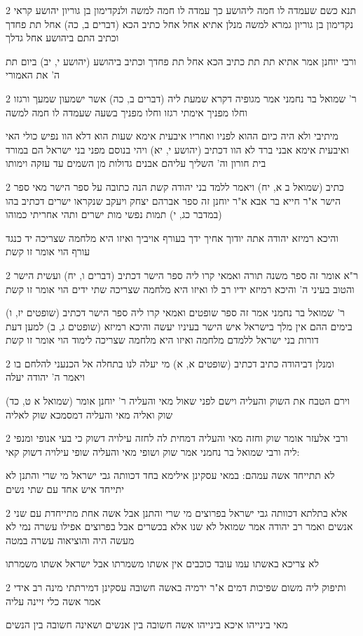 \documentclass[12pt, openany]{book}
\newcommand{\sethebfont}{
\fontsize{10.5pt}{21.0pt} \selectfont
}
\newcommand{\twocol}[1]{
	{\sethebfont \begin{multicols}{2}
			#1
	\end{multicols}}	
}
\begin{document}
\twocol{תנא כשם שעמדה לו חמה ליהושע כך עמדה לו חמה למשה ולנקדימון בן גוריון יהושע קראי נקדימון בן גוריון גמרא למשה מנלן אתיא אחל אחל כתיב הכא (דברים ב, כה) אחל תת פחדך וכתיב התם ביהושע אחל גדלך
\par ורבי יוחנן אמר אתיא תת תת כתיב הכא אחל תת פחדך וכתיב ביהושע (יהושע י, יב) ביום תת ה' את האמורי}
\twocol{ר' שמואל בר נחמני אמר מגופיה דקרא שמעת ליה (דברים ב, כה) אשר ישמעון שמעך ורגזו וחלו מפניך אימתי רגזו וחלו מפניך בשעה שעמדה לו חמה למשה
\par מיתיבי ולא היה כיום ההוא לפניו ואחריו איבעית אימא שעות הוא דלא הוו נפיש כולי האי ואיבעית אימא אבני ברד לא הוו דכתיב (יהושע י, יא) ויהי בנוסם מפני בני ישראל הם במורד בית חורון וה' השליך עליהם אבנים גדולות מן השמים עד עזקה וימותו}
\twocol{כתיב (שמואל ב א, יח) ויאמר ללמד בני יהודה קשת הנה כתובה על ספר הישר מאי ספר הישר א"ר חייא בר אבא א"ר יוחנן זה ספר אברהם יצחק ויעקב שנקראו ישרים דכתיב בהו (במדבר כג, י) תמות נפשי מות ישרים ותהי אחריתי כמוהו
\par והיכא רמיזא יהודה אתה יודוך אחיך ידך בעורף אויביך ואיזו היא מלחמה שצריכה יד כנגד עורף הוי אומר זו קשת}
\twocol{ר"א אומר זה ספר משנה תורה ואמאי קרו ליה ספר הישר דכתיב (דברים ו, יח) ועשית הישר והטוב בעיני ה' והיכא רמיזא ידיו רב לו ואיזו היא מלחמה שצריכה שתי ידים הוי אומר זו קשת
\par ר' שמואל בר נחמני אמר זה ספר שופטים ואמאי קרו ליה ספר הישר דכתיב (שופטים יז, ו) בימים ההם אין מלך בישראל איש הישר בעיניו יעשה והיכא רמיזא (שופטים ג, ב) למען דעת דורות בני ישראל ללמדם מלחמה ואיזו היא מלחמה שצריכה לימוד הוי אומר זו קשת}
\twocol{ומנלן דביהודה כתיב דכתיב (שופטים א, א) מי יעלה לנו בתחלה אל הכנעני להלחם בו ויאמר ה' יהודה יעלה
\par (שמואל א ט, כד) וירם הטבח את השוק והעליה וישם לפני שאול מאי והעליה ר' יוחנן אומר שוק ואליה מאי והעליה דמסמכא שוק לאליה}
\twocol{ורבי אלעזר אומר שוק וחזה מאי והעליה דמחית לה לחזה עילויה דשוק כי בעי אנופי ומנפי ליה ורבי שמואל בר נחמני אמר שוק ושופי מאי והעליה שופי עילויה דשוק קאי:
\par לא תתייחד אשה עמהם: במאי עסקינן אילימא בחד דכוותה גבי ישראל מי שרי והתנן לא יתייחד איש אחד עם שתי נשים}
\twocol{אלא בתלתא דכוותה גבי ישראל בפרוצים מי שרי והתנן אבל אשה אחת מתייחדת עם שני אנשים ואמר רב יהודה אמר שמואל לא שנו אלא בכשרים אבל בפרוצים אפילו עשרה נמי לא מעשה היה והוציאוה עשרה במטה
\par לא צריכא באשתו עמו עובד כוכבים אין אשתו משמרתו אבל ישראל אשתו משמרתו}
\twocol{ותיפוק ליה משום שפיכות דמים א"ר ירמיה באשה חשובה עסקינן דמירתתי מינה רב אידי אמר אשה כלי זיינה עליה
\par מאי בינייהו איכא בינייהו אשה חשובה בין אנשים ושאינה חשובה בין הנשים}
\end{document}
